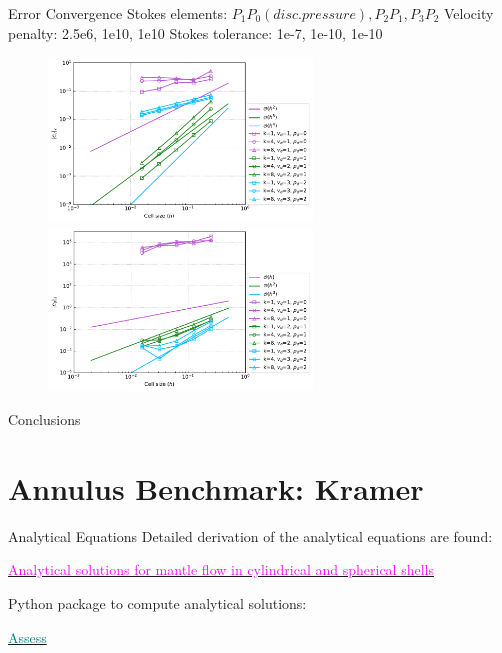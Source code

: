 \documentclass[10pt,aspectratio=169]{beamer}
\begin{document}
\begin{frame}{Error Convergence}
	Stokes elements: $P_{1}P_{0} (disc. pressure), P_{2}P_{1}, P_{3}P_{2}$  \newline
	Velocity penalty: 2.5e6, 1e10, 1e10 \newline
	Stokes tolerance: 1e-7, 1e-10, 1e-10
	\begin{figure}[!htb]
		\begin{multicols}{2}
			\includegraphics[width=7cm]{../Annulus_Benchmark_Thieulot/benchmark_figs/vel_err_conv_vel_penalty_1.0e+10_stokes_tol_1.0e-10_all_k.pdf}\par
			\hspace{3.0in} 
			 \includegraphics[width=7cm]{../Annulus_Benchmark_Thieulot/benchmark_figs/p_err_conv_vel_penalty_1.0e+10_stokes_tol_1.0e-10_all_k.pdf}
		\end{multicols}
	\end{figure}
\end{frame}

\begin{frame}{Conclusions}

\end{frame}

\section{Annulus Benchmark: Kramer}

\begin{frame}{Analytical Equations}
	Detailed derivation of the analytical equations are found:
	
	\href{https://gmd.copernicus.org/articles/14/1899/2021/}{\textcolor{magenta}{Analytical solutions for mantle flow in cylindrical and spherical shells}}
	
	\vspace{0.25in}
	
	Python package to compute analytical solutions:
	
	\href{https://assess.readthedocs.io/en/latest/}{\textcolor{teal}{Assess}}
\end{frame}
\end{document}
